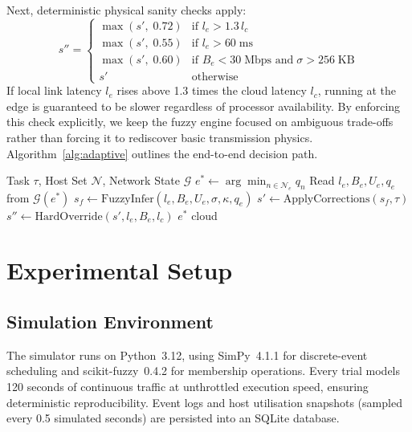 \documentclass[conference]{IEEEtran}
\begin{document}
Next, deterministic physical sanity checks apply:
\begin{equation}
  s'' = \begin{cases}
    \max(s',\; 0.72) & \text{if } l_e > 1.3\,l_c \\
    \max(s',\; 0.55) & \text{if } l_e > 60\;\text{ms} \\
    \max(s',\; 0.60) & \text{if } B_e < 30\;\text{Mbps and}\;\sigma>256\;\text{KB} \\
    s'              & \text{otherwise}
  \end{cases}
  \label{eq:override}
\end{equation}
If local link latency $l_e$ rises above 1.3 times the cloud latency $l_c$, running at the edge is guaranteed to be slower regardless of processor availability. By enforcing this check explicitly, we keep the fuzzy engine focused on ambiguous trade-offs rather than forcing it to rediscover basic transmission physics. Algorithm~\ref{alg:adaptive} outlines the end-to-end decision path.

\begin{algorithm}
\caption{Adaptive Offloading Decision Procedure}
\label{alg:adaptive}
\begin{algorithmic}[1]
\REQUIRE Task $\tau$, Host Set $\mathcal{N}$, Network State $\mathcal{G}$
\STATE $e^* \leftarrow \arg\min_{n \in \mathcal{N}_e} q_n$
\STATE Read $l_e, B_e, U_e, q_e$ from $\mathcal{G}(e^*)$
\STATE $s_f \leftarrow \mathrm{FuzzyInfer}(l_e, B_e, U_e, \sigma, \kappa, q_e)$
\STATE $s' \leftarrow \mathrm{ApplyCorrections}(s_f, \tau)$
\STATE $s'' \leftarrow \mathrm{HardOverride}(s', l_e, B_e, l_c)$
  \RETURN $e^*$
\ELSE
  \RETURN cloud
\ENDIF
\end{algorithmic}
\end{algorithm}

\section{Experimental Setup}
\label{sec:setup}

\subsection{Simulation Environment}
The simulator runs on Python~3.12, using SimPy~4.1.1 for discrete-event scheduling and scikit-fuzzy~0.4.2 for membership operations. Every trial models 120 seconds of continuous traffic at unthrottled execution speed, ensuring deterministic reproducibility. Event logs and host utilisation snapshots (sampled every 0.5 simulated seconds) are persisted into an SQLite database.
\end{document}
